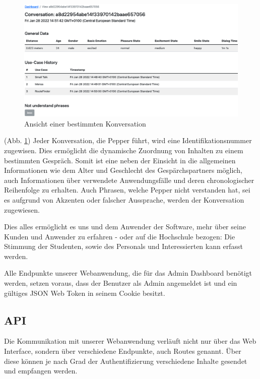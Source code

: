 \begin{figure}[H]
    \includegraphics[width=\textwidth]{Figures/NodeChapter/webappdetail.png}
    \caption{Ansicht einer bestimmten Konversation}
    \label{fig:webappdetail}
    \centering
\end{figure}

(Abb. \ref{fig:webappdetail}) Jeder Konversation, die Pepper führt, wird eine Identifikationsnummer zugewisen. Dies ermöglicht die dynamische Zuordnung von Inhalten zu einem bestimmten Gespräch. Somit ist eine neben der Einsicht in die allgemeinen Informationen wie dem Alter und Geschlecht des Gespärchspartners möglich, auch Informationen über verwendete Anwendungsfälle und deren chronologischer Reihenfolge zu erhalten. Auch Phrasen, welche Pepper nicht verstanden hat, sei es aufgrund von Akzenten oder falscher Aussprache, werden der Konversation zugewiesen.

Dies alles ermöglicht es uns und dem Anwender der Software, mehr über seine Kunden und Anwender zu erfahren - oder auf die Hochschule bezogen: Die Stimmung der Studenten, sowie des Personals und Interessierten kann erfasst werden.

Alle Endpunkte unserer Webanwendung, die für das Admin Dashboard benötigt werden, setzen voraus, dass der Benutzer als Admin angemeldet ist und ein gültiges JSON Web Token in seinem Cookie besitzt.\\


\subsection{API}
\label{sec:nodechapter-api}
Die Kommunikation mit unserer Webanwendung verläuft nicht nur über das Web Interface, sondern über verschiedene Endpunkte, auch Routes genannt. Über diese können je nach Grad der Authentifizierung verschiedene Inhalte gesendet und empfangen werden.

